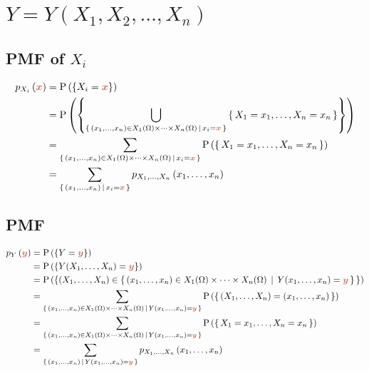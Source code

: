 \documentclass{article}
\DeclareRobustCommand{\myRandV}[1]{#1} %
\newcommand{\myPMF}[2]{p_{#1}\left(#2\right)}
\newcommand{\myP}[1]{\operatorname{P}\left(#1\right)} %
\newcommand{\myParam}[1]{\textcolor{myParamColor}{\bm{#1}}}
\begin{document}
\section{$Y = Y(X_1, X_2, \dots, X_n)$}
\subsection{PMF of $\myRandV{X_i}$}

\begin{equation*}
\begin{aligned}
    \myPMF{\myRandV{X_i}}{\myParam{x}} &= \myP{\{\myRandV{X_i} = \myParam{x}\}} \\
    &= \myP{\left\{ \bigcup_{\left\{\, (x_1, \dots, x_n) \in \myRandV{X_1}(\Omega) \times \dots \times \myRandV{X_n}(\Omega) \, \mid \, x_i = \myParam{x} \,\right\}} \left\{\, \myRandV{X_1} = x_1, \dots, \myRandV{X_n} = x_n \,\right\} \right\}} \\
    &= \sum_{\left\{\, (x_1, \dots, x_n) \in \myRandV{X_1}(\Omega) \times \dots \times \myRandV{X_n}(\Omega) \, \mid \, x_i = \myParam{x} \,\right\}} \myP{\left\{\, \myRandV{X_1} = x_1, \dots, \myRandV{X_n} = x_n \,\right\}} \\
    &= \sum_{\left\{\, (x_1, \dots, x_n) \, \mid \, x_i = \myParam{x} \,\right\}} \myPMF{\myRandV{X_1}, \dots, \myRandV{X_n}}{x_1, \dots, x_n}
\end{aligned}
\end{equation*}

\subsection{PMF}

\begin{equation*}
\begin{aligned}
\myPMF{\myRandV{Y}}{\myParam{y}} &= \myP{\{\myRandV{Y} = \myParam{y}\}} \\
&= \myP{\left\{\myRandV{Y}(\myRandV{X_1}, \dots, \myRandV{X_n}) = \myParam{y}\right\}} \\
&= \myP{\left\{ (\myRandV{X_1}, \dots, \myRandV{X_n}) \in \left\{\, (x_1, \dots, x_n) \in \myRandV{X_1}(\Omega) \times \dots \times \myRandV{X_n}(\Omega) \, \mid \, \myRandV{Y}(x_1, \dots, x_n) = \myParam{y} \,\right\}\,\right\}} \\
&= \sum_{\left\{\, (x_1, \dots, x_n) \in \myRandV{X_1}(\Omega) \times \dots \times \myRandV{X_n}(\Omega) \, \mid \, \myRandV{Y}(x_1, \dots, x_n) = \myParam{y} \,\right\}} \myP{\left\{\, (\myRandV{X_1}, \dots, \myRandV{X_n}) = (x_1, \dots, x_n) \,\right\}} \\
&= \sum_{\left\{\, (x_1, \dots, x_n) \in \myRandV{X_1}(\Omega) \times \dots \times \myRandV{X_n}(\Omega) \, \mid \, \myRandV{Y}(x_1, \dots, x_n) = \myParam{y} \,\right\}} \myP{\left\{\, \myRandV{X_1} = x_1, \dots, \myRandV{X_n} = x_n \,\right\}} \\
&= \sum_{\left\{\, (x_1, \dots, x_n) \, \mid \, \myRandV{Y}(x_1, \dots, x_n) = \myParam{y} \,\right\}} \myPMF{\myRandV{X_1}, \dots, \myRandV{X_n}}{x_1, \dots, x_n} \\
\end{aligned}
\end{equation*}
\end{document}
